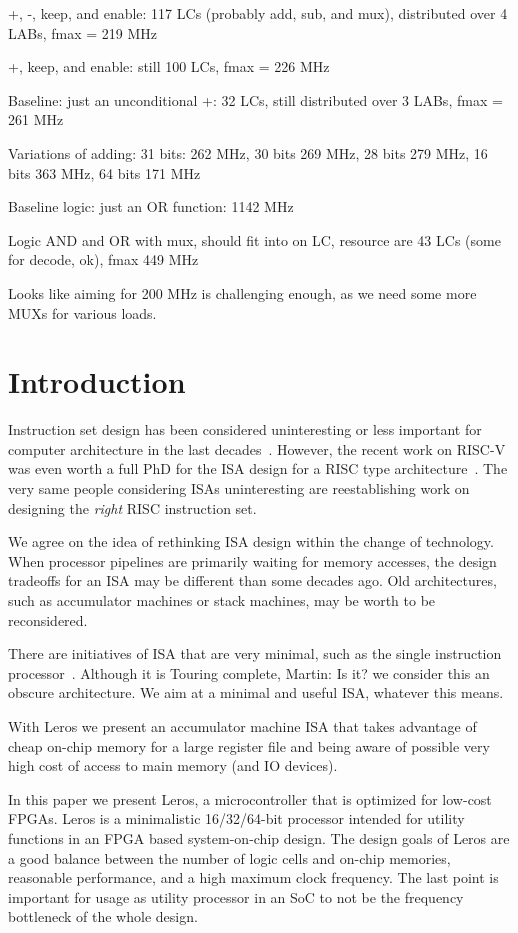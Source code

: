 \documentclass[a4paper,fontsize=10pt,twoside,DIV15,BCOR12mm,headinclude=true,footinclude=false,pagesize,bibtotoc]{scrbook}
\newcommand{\martin}[1]{{\color{blue} Martin: #1}}
\begin{document}
+, -, keep, and enable: 117 LCs (probably add, sub, and mux), distributed over 4 LABs, fmax = 219 MHz

+, keep, and enable: still 100 LCs, fmax = 226 MHz

Baseline: just an unconditional +: 32 LCs, still distributed over 3 LABs, fmax = 261 MHz

Variations of adding: 31 bits: 262 MHz, 30 bits 269 MHz, 28 bits 279 MHz, 16 bits 363 MHz, 64 bits 171 MHz

Baseline logic: just an OR function: 1142 MHz

Logic AND and OR with mux, should fit into on LC, resource are 43 LCs (some for decode, ok), fmax 449 MHz

Looks like aiming for 200 MHz is challenging enough, as we need some more MUXs
for various loads.



\chapter{Introduction}
\label{sec:intro}

Instruction set design has been considered uninteresting or less important for computer
architecture in the last decades~\cite{the right H and P book, or the slides}.
However, the recent work on RISC-V was even worth a full PhD for the ISA design
for a RISC type architecture~\cite{Andrew thesis}.
The very same people considering ISAs uninteresting are reestablishing work on
designing the \emph{right} RISC instruction set.

We agree on the idea of rethinking ISA design within the change of technology.
When processor pipelines are primarily waiting for memory accesses, the design
tradeoffs for an ISA may be different than some decades ago.
Old architectures, such as accumulator machines or stack machines, may be worth
to be reconsidered.

There are initiatives of ISA that are very minimal, such as the single instruction
processor~\cite{find it}. Although it is Touring complete, \martin{Is it?} we consider this
an obscure architecture.
We aim at a minimal and useful ISA, whatever this means.

With Leros we present an accumulator machine ISA that takes advantage of cheap
on-chip memory for a large register file and being aware of possible very high cost
of access to main memory (and IO devices).


In this paper we present Leros, a microcontroller that is optimized for low-cost FPGAs.
Leros is a minimalistic 16/32/64-bit processor intended for utility functions in an FPGA based
system-on-chip design. The design goals of Leros are a good balance between
the number of logic cells and on-chip memories, reasonable performance, and a high
maximum clock frequency. The last point is important for usage as utility processor
in an SoC to not be the frequency bottleneck of the whole design.
\end{document}
